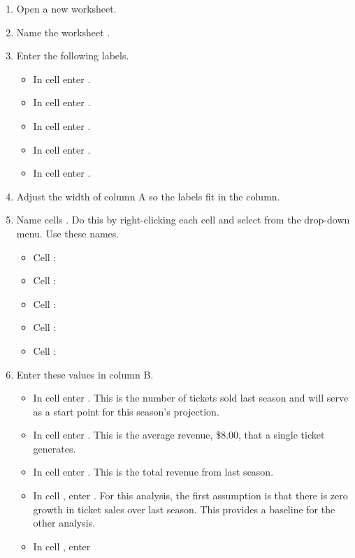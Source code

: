 \begin{enumerate}
	\item Open a new worksheet.
	\item Name the worksheet .
	\item Enter the following labels.
	
	\begin{itemize}
		\item In cell  enter .
		\item In cell  enter .
		\item In cell  enter .
		\item In cell  enter .
		\item In cell  enter .
	\end{itemize}
	
	\item Adjust the width of column A so the labels fit in the column.
	\item Name cells . Do this by right-clicking each cell and select  from the drop-down menu. Use these names.

	\begin{itemize}
		\item Cell : 
		\item Cell : 
		\item Cell : 
		\item Cell : 
		\item Cell : 
	\end{itemize}

	\item Enter these values in column B.

	\begin{itemize}
		\item In cell  enter . This is the number of tickets sold last season and will serve as a start point for this season's projection.
		\item In cell  enter . This is the average revenue, \$$ 8.00 $, that a single ticket generates.
		\item In cell  enter . This is the total revenue from last season. 
		\item In cell , enter . For this analysis, the first assumption is that there is zero growth in ticket sales over last season. This provides a baseline for the other analysis.
		\item In cell , enter 
	\end{itemize}


\end{enumerate}
